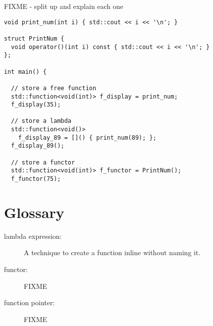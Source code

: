 FIXME - split up and explain each one
\begin{lstlisting}
void print_num(int i) { std::cout << i << '\n'; }

struct PrintNum {
  void operator()(int i) const { std::cout << i << '\n'; }
};

int main() {
 
  // store a free function
  std::function<void(int)> f_display = print_num;
  f_display(35);

  // store a lambda
  std::function<void()> 
    f_display_89 = []() { print_num(89); };
  f_display_89();

  // store a functor
  std::function<void(int)> f_functor = PrintNum();
  f_functor(75);
\end{lstlisting}
 
\section{Glossary}

\begin{description}
\item[lambda expression:] A technique to create a function inline without naming it.
\item[functor:] FIXME
\item[function pointer:] FIXME
\end{description}
